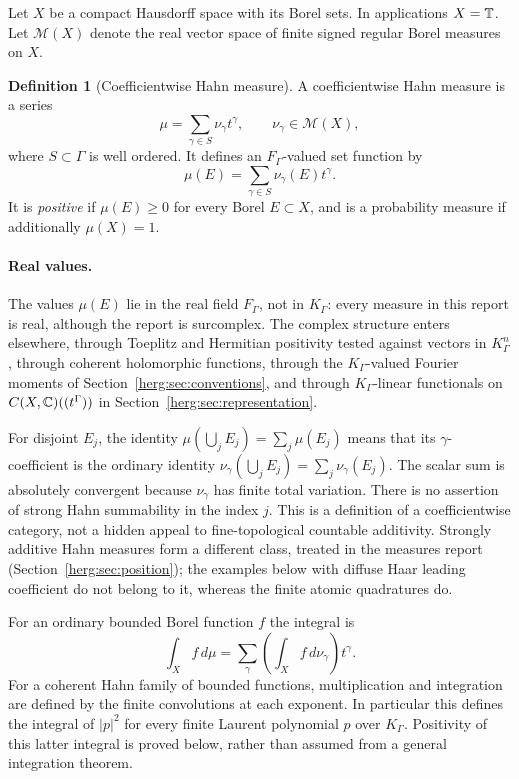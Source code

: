 \documentclass[11pt,letterpaper]{article}
\theoremstyle{definition}
\newtheorem{definition}[theorem]{Definition}
\newcommand{\FG}{F_\Gamma}\newcommand{\KG}{K_\Gamma}
\newcommand{\dd}{\,d}
\numberwithin{equation}{section}
\begin{document}
Let $X$ be a compact Hausdorff space with its Borel sets. In applications $X=\mathbb T$. Let $\mathcal M(X)$ denote the real vector space of finite signed regular Borel measures on $X$.

\begin{definition}[Coefficientwise Hahn measure]\label{herg:def:measure}
A coefficientwise Hahn measure is a series
\begin{equation}\label{herg:eq:measuredef}
 \mu=\sum_{\gamma\in S}\nu_\gamma t^\gamma,
 \qquad \nu_\gamma\in\mathcal M(X),
\end{equation}
where $S\subset\Gamma$ is well ordered. It defines an $\FG$-valued set function by
\[
 \mu(E)=\sum_{\gamma\in S}\nu_\gamma(E)t^\gamma.
\]
It is \emph{positive} if $\mu(E)\ge0$ for every Borel $E\subset X$, and is a probability measure if additionally $\mu(X)=1$.
\end{definition}

\paragraph{Real values.}
The values $\mu(E)$ lie in the real field $\FG$, not in $\KG$: every measure in this report is real, although the report is surcomplex. The complex structure enters elsewhere, through Toeplitz and Hermitian positivity tested against vectors in $\KG^n$, through coherent holomorphic functions, through the $\KG$-valued Fourier moments of Section~\ref{herg:sec:conventions}, and through $\KG$-linear functionals on $C(X,\mathbb C)((t^\Gamma))$ in Section~\ref{herg:sec:representation}.

For disjoint $E_j$, the identity $\mu(\bigcup_jE_j)=\sum_j\mu(E_j)$ means that its $\gamma$-coefficient is the ordinary identity $\nu_\gamma(\bigcup_jE_j)=\sum_j\nu_\gamma(E_j)$. The scalar sum is absolutely convergent because $\nu_\gamma$ has finite total variation. There is no assertion of strong Hahn summability in the index $j$. This is a definition of a coefficientwise category, not a hidden appeal to fine-topological countable additivity. Strongly additive Hahn measures form a different class, treated in the measures report (Section~\ref{herg:sec:position}); the examples below with diffuse Haar leading coefficient do not belong to it, whereas the finite atomic quadratures do.

For an ordinary bounded Borel function $f$ the integral is
\[
 \int_X f\dd\mu=\sum_\gamma\left(\int_X f\dd\nu_\gamma\right)t^\gamma.
\]
For a coherent Hahn family of bounded functions, multiplication and integration are defined by the finite convolutions at each exponent. In particular this defines the integral of $|p|^2$ for every finite Laurent polynomial $p$ over $\KG$. Positivity of this latter integral is proved below, rather than assumed from a general integration theorem.
\end{document}

